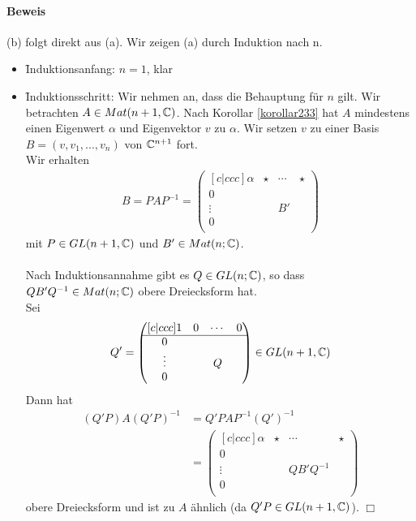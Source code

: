 \paragraph{Beweis}
(b) folgt direkt aus (a). Wir zeigen (a) durch Induktion nach n.
\begin{itemize}
\item \f{Induktionsanfang:} $n = 1$, klar
\item \f{Induktionsschritt:} Wir nehmen an, dass die Behauptung für $n$ gilt. Wir betrachten $A \in Mat(n+1,\mathbb{C})$. Nach Korollar \ref{korollar233} hat $A$ mindestens einen Eigenwert $\alpha$ und Eigenvektor $v$ zu $\alpha$.
Wir setzen $v$ zu einer Basis $B = (v, v_1, ..., v_n)$ von $\mathbb{C}^{n+1}$ fort. \\
Wir erhalten
\begin{align}
B = PAP^{-1} = 
\begin{pmatrix}[c|ccc]
\alpha & \star & \cdots & \star \\ \hline
0 & & & \\
\vdots & & B' & \\
0 & & & \\
\end{pmatrix}
\end{align}
mit $P \in GL(n+1, \mathbb{C})$ und $B' \in Mat(n; \mathbb{C})$.\\\\
Nach Induktionsannahme gibt es $Q \in GL(n; \mathbb{C})$, so dass $QB'Q^{-1} \in Mat(n; \mathbb{C})$ obere Dreiecksform hat. \\
Sei
\begin{align}
Q' =
\begin{pmatrix}[c|ccc]
1 & 0 & \cdots & 0 \\ \hline
0 & & & \\
\vdots & & Q & \\
0 & & & \\
\end{pmatrix}
\in GL(n+1, \mathbb{C})
\end{align}
Dann hat
\begin{align}
(Q'P)A(Q'P)^{-1} &= Q'PAP^{-1} (Q')^{-1} \\
&= 
\begin{pmatrix}[c|ccc]
\alpha & \star & \cdots & \star \\ \hline
0 & & & \\
\vdots & & QB'Q^{-1} & \\
0 & & & \\
\end{pmatrix}
\end{align}
obere Dreiecksform und ist zu $A$ ähnlich (da $Q'P \in GL(n+1, \mathbb{C})$). \hfill $\Box$
\end{itemize}


